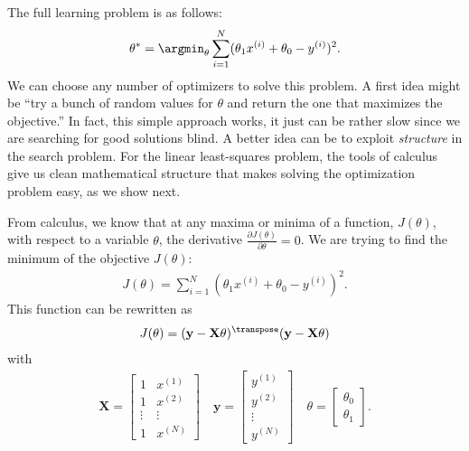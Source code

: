 
    The full learning problem is as follows:
    \begin{align}
        \theta^* = \argmin_{\theta} \sum_{i=1}^N (\theta_1 x^{(i)} + \theta_0 - y^{(i)})^2.
    \end{align}
    We can choose any number of optimizers to solve this problem. A first idea might be ``try a bunch of random values for $\theta$ and return the one that maximizes the objective.'' In fact, this simple approach works, it just can be rather slow since we are searching for good solutions blind. A better idea can be to exploit \textit{structure} in the search problem. For the linear least-squares problem, the tools of calculus give us clean mathematical structure that makes solving the optimization problem easy, as we show next.

    From calculus, we know that at any maxima or minima of a function, $J(\theta)$, with respect to a variable $\theta$, the derivative $\frac{\partial{J(\theta)}}{\partial{\theta}} = 0$. We are trying to find the minimum of the objective $J(\theta)$:
    \begin{align}
        J(\theta) = \sum_{i=1}^N (\theta_1 x^{(i)} + \theta_0 - y^{(i)})^2.
    \end{align}
    This function can be rewritten as
    \begin{align}
        J(\theta) = (\mathbf{y} - \mathbf{X}\theta)^\transpose(\mathbf{y} - \mathbf{X}\theta)
    \end{align}
    with
    \begin{align}
        \mathbf{X} =
        \begin{bmatrix}
            1      & x^{(1)} \\
            1      & x^{(2)} \\
            \vdots & \vdots  \\
            1      & x^{(N)}
        \end{bmatrix}
        \quad
        \mathbf{y} =
        \begin{bmatrix}
            y^{(1)} \\
            y^{(2)} \\
            \vdots  \\
            y^{(N)}
        \end{bmatrix}
        \quad
        \theta =
        \begin{bmatrix}
            \theta_0 \\
            \theta_1
        \end{bmatrix}.
    \end{align}

